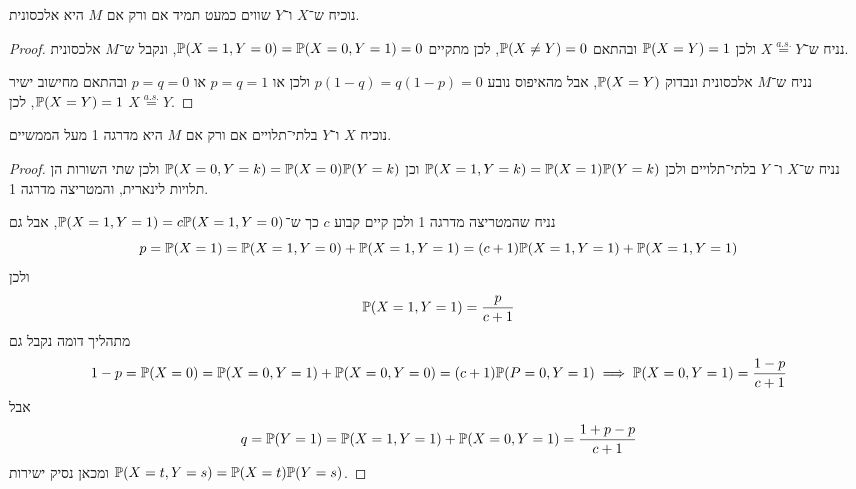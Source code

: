 \subquestion{}
נוכיח ש־$X$ ו־$Y$ שווים כמעט תמיד אם ורק אם $M$ היא אלכסונית.
\begin{proof}
	נניח ש־$X \overset{a.s.}{=} Y$ ולכן $\mathbb{P}(X = Y) = 1$ ובהתאם $\mathbb{P}(X \ne Y) = 0$, לכן מתקיים $\mathbb{P}(X = 1, Y = 0) = \mathbb{P}(X = 0, Y = 1) = 0$, ונקבל ש־$M$ אלכסונית.

	נניח ש־$M$ אלכסונית ונבדוק $\mathbb{P}(X = Y)$, אבל מהאיפוס נובע $p (1 - q) = q(1 - p) = 0$ ולכן או $p = q = 1$ או $p = q = 0$ ובהתאם מחישוב ישיר $\mathbb{P}(X = Y) = 1$, לכן $X \overset{a.s.}{=} Y$.
\end{proof}

\subquestion{}
נוכיח $X$ ו־$Y$ בלתי־תלויים אם ורק אם $M$ היא מדרגה 1 מעל הממשיים.
\begin{proof}
	נניח ש־$X$ ו־ $Y$ בלתי־תלויים ולכן $\mathbb{P}(X = 1, Y = k) = \mathbb{P}(X = 1) \mathbb{P}(Y = k)$ וכן $\mathbb{P}(X = 0, Y = k) = \mathbb{P}(X = 0) \mathbb{P}(Y = k)$ ולכן שתי השורות הן תלויות לינארית, והמטריצה מדרגה 1.

	נניח שהמטריצה מדרגה 1 ולכן קיים קבוע $c$ כך ש־$\mathbb{P}(X = 1, Y = 1) = c \mathbb{P}(X = 1, Y = 0)$, אבל גם
	\[
		p = \mathbb{P}(X = 1) = \mathbb{P}(X = 1, Y = 0) + \mathbb{P}(X = 1, Y = 1) = (c + 1) \mathbb{P}(X = 1, Y = 1) + \mathbb{P}(X = 1, Y = 1)
	\]
	ולכן
	\[
		\mathbb{P}(X = 1, Y = 1) = \frac{p}{c + 1}
	\]
	מתהליך דומה נקבל גם
	\[
		1 - p = \mathbb{P}(X = 0) = \mathbb{P}(X = 0, Y = 1) + \mathbb{P}(X = 0, Y = 0) = (c + 1) \mathbb{P}(P = 0, Y = 1)
		\implies \mathbb{P}(X = 0, Y = 1) = \frac{1 - p}{c + 1}
	\]
	אבל
	\[
		q = \mathbb{P}(Y = 1) = \mathbb{P}(X = 1, Y = 1) + \mathbb{P}(X = 0, Y = 1) = \frac{1 + p - p}{c + 1}
	\]
	ומכאן נסיק ישירות $\mathbb{P}(X = t, Y = s) = \mathbb{P}(X = t) \mathbb{P}(Y = s)$.
\end{proof}



